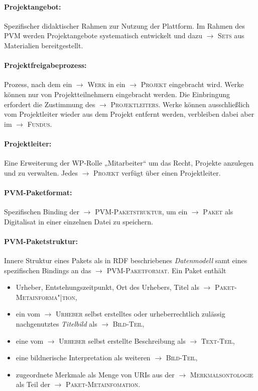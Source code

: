 \documentclass[a4paper,11pt]{article}
\newcommand{\glossar}[1]{{$\to$ \textsc{#1}}}
\begin{document}
\paragraph{Projektangebot:} 
Spezifischer didaktischer Rahmen zur Nutzung der Plattform. Im Rahmen des PVM
werden Projektangebote systematisch entwickelt und dazu \glossar{Sets} aus
Materialien bereitgestellt.

\paragraph{Projektfreigabeprozess:} 
Prozess, nach dem ein \glossar{Werk} in ein \glossar{Projekt} eingebracht
wird. Werke können nur von Projektteilnehmern eingebracht werden. Die
Einbringung erfordert die Zustimmung des \glossar{Projektleiters}. Werke können
ausschließlich vom Projektleiter wieder aus dem Projekt entfernt werden,
verbleiben dabei aber im \glossar{Fundus}.

\paragraph{Projektleiter:} 
Eine Erweiterung der WP-Rolle „Mitarbeiter“ um das Recht, Projekte anzulegen
und zu verwalten.  Jedes \glossar{Projekt} verfügt über einen Projektleiter.

\paragraph{PVM-Paketformat:}
Spezifischen Binding der \glossar{PVM-Paketstruktur}, um ein \glossar{Paket}
als Digitalisat in einer einzelnen Datei zu speichern.

\paragraph{PVM-Paketstruktur:}
Innere Struktur eines Pakets als in RDF beschriebenes \emph{Datenmodell} samt
eines spezifischen Bindings an das \glossar{PVM-Paketformat}.  Ein Paket
enthält
\begin{itemize}
\item Urheber, Entstehungszeitpunkt, Ort des Urhebers, Titel als
  \glossar{Paket-Metainforma"|tion}, 
\item ein vom \glossar{Urheber} selbst erstelltes oder urheberrechtlich
  zulässig nachgenutztes \emph{Titelbild} als \glossar{Bild-Teil},
\item eine vom \glossar{Urheber} selbst erstellte Beschreibung als
  \glossar{Text-Teil},
\item eine bildnerische Interpretation als weiteren \glossar{Bild-Teil},
\item zugeordnete Merkmale als Menge von URIs aus der
  \glossar{Merkmalsontologie} als Teil der \glossar{Paket-Metainfomation}.
\end{itemize}
\end{document}
